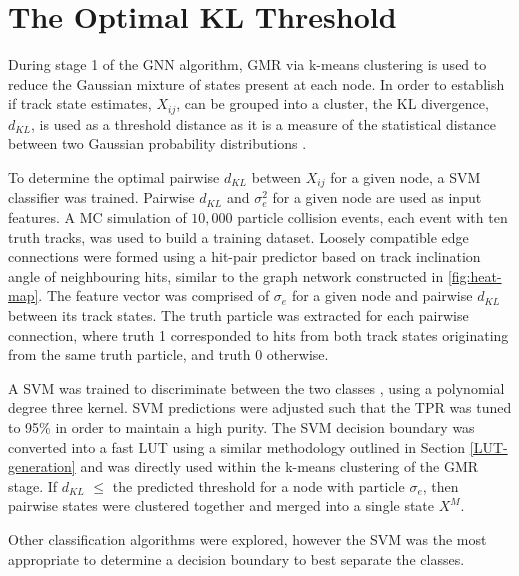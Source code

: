 \section{The Optimal KL Threshold}
\label{chapter-6-kl-threshold}

During stage 1 of the GNN algorithm, GMR via k-means clustering is used to reduce the Gaussian mixture of states present at each node. In order to establish if track state estimates, $X_{ij}$, can be grouped into a cluster, the KL divergence, $d_{KL}$, is used as a threshold distance as it is a measure of the statistical distance between two Gaussian probability distributions \cite{KL, FRUHWIRTH19971}.

To determine the optimal pairwise $d_{KL}$ between $X_{ij}$ for a given node, a SVM classifier was trained. Pairwise $d_{KL}$ and $\sigma_{e}^{2}$ for a given node are used as input features. A MC simulation of $10,000$ particle collision events, each event with ten truth tracks, was used to build a training dataset. Loosely compatible edge connections were formed using a hit-pair predictor based on track inclination angle of neighbouring hits, similar to the graph network constructed in \ref{fig:heat-map}. The feature vector was comprised of $\sigma_{e}$ for a given node and pairwise $d_{KL}$ between its track states. The truth particle was extracted for each pairwise connection, where truth 1 corresponded to hits from both track states originating from the same truth particle, and truth 0 otherwise. 


A SVM was trained to discriminate between the two classes \cite{scikit-learn}, using a polynomial degree three kernel. SVM predictions were adjusted such that the TPR was tuned to 95\% in order to maintain a high purity. The SVM decision boundary was converted into a fast LUT using a similar methodology outlined in Section \ref{LUT-generation} and was directly used within the k-means clustering of the GMR stage. If $d_{KL}$ $\leq$ the predicted threshold for a node with particle $\sigma_e$, then pairwise states were clustered together and merged into a single state $X^M$.


Other classification algorithms were explored, however the SVM was the most appropriate to determine a decision boundary to best separate the classes.

